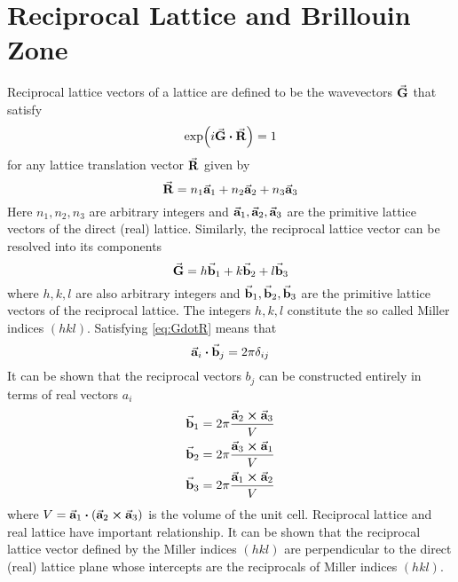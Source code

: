 \appendix

\makeatletter
\renewcommand{\@makechapterhead}[1]{\vspace *{-10\p@ }{\parindent \z@ 
\raggedright \normalfont \ifnum \c@secnumdepth >\m@ne \Huge \bfseries 
\@chapapp \space \thechapter \vskip 10\p@ \fi #1\par \nobreak \vskip 30\p@ }}
\makeatother

\chapter{Reciprocal Lattice and Brillouin Zone}\label{chap:BZ}
Reciprocal lattice vectors of a lattice are defined to be the wavevectors  $\va{G}$ that satisfy 
\begin{equation} \label{eq:GdotR}
    \exp(i \va{G} \vdot \va{R} ) = 1
\end{equation}
for any lattice translation vector $\va{R}$ given by
\begin{equation}
    \va{R} = n_1 \va{a}_1 + n_2 \va{a}_2 +n_3 \va{a}_3
\end{equation}
Here $n_1, n_2, n_3$ are arbitrary integers and $\va{a}_1, \va{a}_2, \va{a}_3$ are the primitive lattice vectors of the direct (real) lattice. Similarly, the reciprocal lattice vector can be resolved into its components 
\begin{equation}
    \va{G} = h \va{b}_1 + k \va{b}_2 + l \va{b}_3
\end{equation}
where $h, k, l$ are also  arbitrary integers and $\va{b}_1, \va{b}_2, \va{b}_3$ are the primitive lattice vectors of the reciprocal lattice. The integers $h, k, l$ constitute the so called Miller indices $(hkl)$. Satisfying \eqref{eq:GdotR} means that 
\begin{equation*}
    \va{a}_i \vdot \va{b}_j = 2 \pi \delta_{ij}
\end{equation*}
It can be shown that the reciprocal vectors $b_j$ can be constructed entirely in terms of real vectors $a_i$
\begin{align}
    \va{b}_1 &= 2 \pi \frac{\va{a}_2 \crossproduct \va{a}_3}{V} \notag \\
    \va{b}_2 &= 2 \pi \frac{\va{a}_3 \crossproduct \va{a}_1}{V} \label{eq:recipro_real}\\
    \va{b}_3 &= 2 \pi \frac{\va{a}_1 \crossproduct \va{a}_2}{V} \notag
\end{align}
where $V = \va{a}_1 \vdot (\va{a}_2 \crossproduct \va{a}_3)$ is the volume of the unit cell. Reciprocal lattice and real lattice have important relationship. It can be shown that the reciprocal lattice vector defined by the Miller indices $(hkl)$ are perpendicular to the direct (real) lattice plane whose intercepts are the reciprocals of Miller indices $(hkl)$. 

